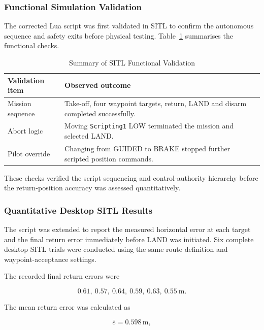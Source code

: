 \documentclass[conference]{IEEEtran}
\begin{document}
\subsubsection*{Functional Simulation Validation}

The corrected Lua script was first validated in SITL to confirm the autonomous sequence and safety exits before physical testing. Table~\ref{tab:sitl-functional-summary} summarises the functional checks.

\begin{table}[htbp]
\caption{Summary of SITL Functional Validation}
\label{tab:sitl-functional-summary}
\centering
\footnotesize
\renewcommand{\arraystretch}{1.05}
\begin{tabularx}{\columnwidth}{@{}lX@{}}
\toprule
\textbf{Validation item} & \textbf{Observed outcome} \\
\midrule
Mission sequence &
Take-off, four waypoint targets, return, LAND and disarm completed successfully. \\
Abort logic &
Moving \texttt{Scripting1} LOW terminated the mission and selected LAND. \\
Pilot override &
Changing from GUIDED to BRAKE stopped further scripted position commands. \\
\bottomrule
\end{tabularx}
\end{table}

These checks verified the script sequencing and control-authority hierarchy before the return-position accuracy was assessed quantitatively.

\subsubsection*{Quantitative Desktop SITL Results}

The script was extended to report the measured horizontal error at each target
and the final return error immediately before LAND was initiated. Six complete
desktop SITL trials were conducted using the same route definition and
waypoint-acceptance settings.

The recorded final return errors were

\begin{equation}
    0.61,\ 0.57,\ 0.64,\ 0.59,\ 0.63,\ 0.55\ \mathrm{m}.
    \label{return-errors}
\end{equation}

The mean return error was calculated as

\begin{equation}
    \bar{e}
    =
    0.598\,\mathrm{m},
\end{equation}
\end{document}
